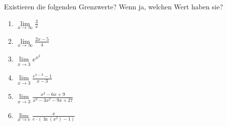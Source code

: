 \item
Existieren die folgenden Grenzwerte? Wenn ja, welchen Wert haben sie?

\begin{multicols}{2}
\begin{enumerate}
\item $\lim\limits_{x \to \infty} \frac{3}{x}$
\item $\lim\limits_{x \to \infty} \frac{2x-5}{4}$
\item $\lim\limits_{x \to 3} e^{x^2}$
\item $\lim\limits_{x \to 3} \frac{e^{x-3}-1}{x-3}$
\item $\lim\limits_{x \to 3} \frac{x^2-6x+9}{x^3-3x^2-9x+27}$
\item $\lim\limits_{x \to e} \frac{x}{e \cdot (\ln(x^2)-1)}$

\end{enumerate}
\end{multicols}

